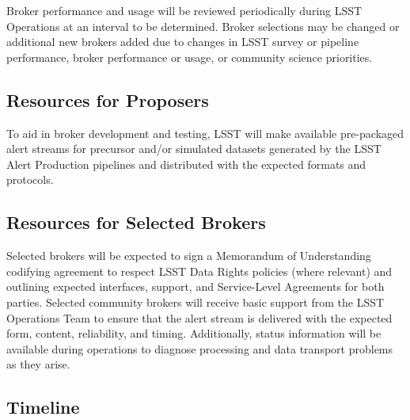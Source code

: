 Broker performance and usage will be reviewed periodically during LSST Operations at an interval to be determined.
Broker selections may be changed or additional new brokers added due to changes in LSST survey or pipeline performance, broker performance or usage, or community science priorities.

\subsection{Resources for Proposers}

To aid in broker development and testing,  LSST will make available pre-packaged alert streams for precursor and/or simulated datasets generated by the LSST Alert Production pipelines and distributed with the expected formats and protocols.

\subsection{Resources for Selected Brokers}

Selected brokers will be expected to sign a Memorandum of Understanding codifying agreement to respect LSST Data Rights policies (where relevant) and outlining expected interfaces, support, and Service-Level Agreements for both parties.
Selected community brokers will receive basic support from the LSST Operations Team to ensure that the alert stream is delivered with the expected form, content, reliability, and timing.
Additionally, status information will be available during operations to diagnose processing and data transport problems as they arise.

\subsection{Timeline}

